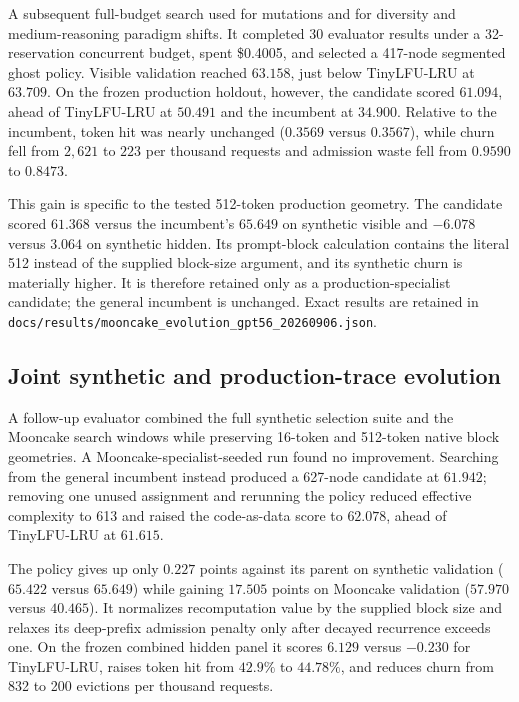 \documentclass[11pt]{article}
\newcommand{\code}[1]{\texttt{\detokenize{#1}}}
\newcommand{\filepath}[1]{\nolinkurl{#1}}
\begin{document}
A subsequent full-budget search used \code{gpt-5.6-luna} for mutations and
\code{gpt-5.6-sol} for diversity and medium-reasoning paradigm shifts.  It
completed 30 evaluator results under a 32-reservation concurrent budget, spent
\$0.4005, and selected a 417-node segmented ghost policy.  Visible validation
reached $63.158$, just below TinyLFU-LRU at $63.709$.  On the frozen production
holdout, however, the candidate scored $61.094$, ahead of TinyLFU-LRU at
$50.491$ and the incumbent at $34.900$.  Relative to the incumbent, token hit
was nearly unchanged ($0.3569$ versus $0.3567$), while churn fell from
$2{,}621$ to $223$ per thousand requests and admission waste fell from $0.9590$
to $0.8473$.

This gain is specific to the tested 512-token production geometry.  The
candidate scored $61.368$ versus the incumbent's $65.649$ on synthetic visible
and $-6.078$ versus $3.064$ on synthetic hidden.  Its prompt-block calculation
contains the literal 512 instead of the supplied block-size argument, and its
synthetic churn is materially higher.  It is therefore retained only as a
production-specialist candidate; the general incumbent is unchanged.  Exact
results are retained in
\filepath{docs/results/mooncake\_evolution\_gpt56\_20260906.json}.

\subsection{Joint synthetic and production-trace evolution}

A follow-up evaluator combined the full synthetic selection suite and the
Mooncake search windows while preserving 16-token and 512-token native block
geometries.  A Mooncake-specialist-seeded run found no improvement.  Searching
from the general incumbent instead produced a 627-node candidate at $61.942$;
removing one unused assignment and rerunning the policy reduced effective
complexity to 613 and raised the code-as-data score to $62.078$, ahead of
TinyLFU-LRU at $61.615$.

The policy gives up only $0.227$ points against its parent on synthetic
validation ($65.422$ versus $65.649$) while gaining $17.505$ points on Mooncake
validation ($57.970$ versus $40.465$).  It normalizes recomputation value by the
supplied block size and relaxes its deep-prefix admission penalty only after
decayed recurrence exceeds one.  On the frozen combined hidden panel it scores
$6.129$ versus $-0.230$ for TinyLFU-LRU, raises token hit from $42.9\%$ to
$44.78\%$, and reduces churn from 832 to 200 evictions per thousand requests.
\end{document}
